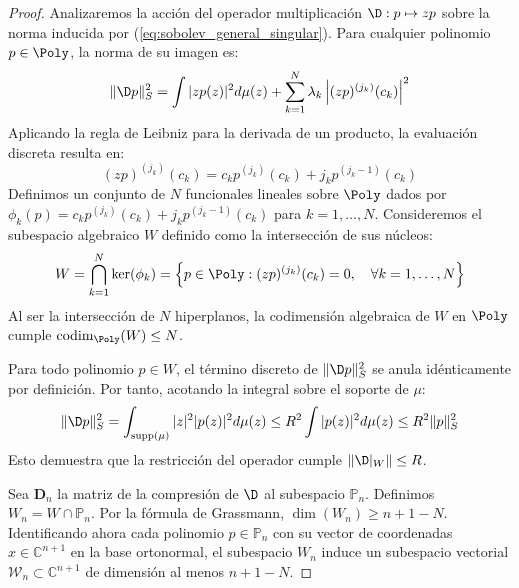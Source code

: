 \begin{proof}
	Analizaremos la acción del operador multiplicación $\D: p \mapsto zp$ sobre la norma inducida por (\ref{eq:sobolev_general_singular}). Para cualquier polinomio $p \in \Poly$, la norma de su imagen es:
	\begin{equation}
		\|\D p\|_S^2 = \int |zp(z)|^2 d\mu(z) + \sum_{k=1}^N \lambda_k \left| (zp)^{(j_k)}(c_k) \right|^2
	\end{equation}
	Aplicando la regla de Leibniz para la derivada de un producto, la evaluación discreta resulta en:
	\begin{equation}\label{eq:leibniz_eval}
		(zp)^{(j_k)}(c_k) = c_k p^{(j_k)}(c_k) + j_k p^{(j_k-1)}(c_k)
	\end{equation}
	Definimos un conjunto de $N$ funcionales lineales sobre $\Poly$ dados por $\phi_k(p) = c_k p^{(j_k)}(c_k) + j_k p^{(j_k-1)}(c_k)$ para $k=1,\dots,N$. Consideremos el subespacio algebraico $W$ definido como la intersección de sus núcleos:
	\begin{equation}
		W = \bigcap_{k=1}^N \ker(\phi_k) = \left\{ p \in \Poly : (zp)^{(j_k)}(c_k) = 0, \quad \forall k=1,\dots,N \right\}
	\end{equation}
	Al ser la intersección de $N$ hiperplanos, la codimensión algebraica de $W$ en $\Poly$ cumple $\operatorname{codim}_{\Poly}(W) \le N$.

	Para todo polinomio $p \in W$, el término discreto de $\|\D p\|_S^2$ se anula idénticamente por definición. Por tanto, acotando la integral sobre el soporte de $\mu$:
	\begin{equation}
		\|\D p\|_S^2 = \int_{\operatorname{supp}(\mu)} |z|^2 |p(z)|^2 d\mu(z) \le R^2 \int |p(z)|^2 d\mu(z) \le R^2 \|p\|_S^2
	\end{equation}
	Esto demuestra que la restricción del operador cumple $\|\D|_W\| \le R$.

	Sea $\mathbf{D}_n$ la matriz de la compresión de $\D$ al subespacio $\mathbb{P}_{n}$. Definimos $W_n = W \cap \mathbb{P}_{n}$. Por la fórmula de Grassmann, $\dim(W_n) \ge n+1 - N$. Identificando ahora cada polinomio $p \in \mathbb{P}_{n}$ con su vector de coordenadas $x \in \mathbb{C}^{n+1}$ en la base ortonormal, el subespacio $W_n$ induce un subespacio vectorial $\mathcal{W}_n \subset \mathbb{C}^{n+1}$ de dimensión al menos $n+1-N$.


\end{proof}
